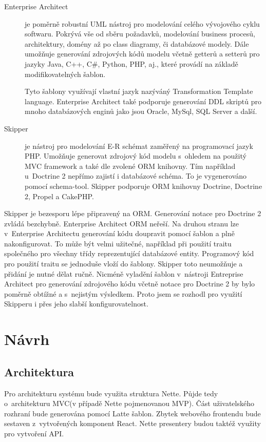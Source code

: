 \documentclass[thesis=B,czech]{FITthesis}[2012/06/26]
\begin{document}
\begin{description}
	\item[Enterprise Architect]
	je poměrně robustní UML nástroj pro modelování celého vývojového cyklu softwaru. Pokrývá vše od sběru požadavků, modelování business procesů, architektury, domény až po class diagramy, či databázové modely. Dále umožňuje generování zdrojových kódů modelu včetně getterů a setterů pro jazyky Java, C++, C\#, Python, PHP, aj., které provádí na základě modifikovatelných šablon.
	
	Tyto šablony využívají vlastní jazyk nazýváný Transformation Template language. Enterprise Architect také podporuje generování DDL skriptů pro mnoho databázových enginů jako jsou Oracle, MySql, SQL Server a další.\cite{enterprise_architect}

	\item[Skipper\cite{skipper}]
	je nástroj pro modelování E-R schémat zaměřený na programovací jazyk PHP. Umožňuje generovat zdrojový kód modelu s~ohledem na použitý MVC framework a také dle zvolené ORM knihovny. Tím například u~Doctrine 2 nepřímo zajistí i databázové schéma. To je vygenerováno pomocí schema-tool. Skipper podporuje ORM knihovny Doctrine, Doctrine 2, Propel a CakePHP.\cite{skipper_features}
\end{description}

	Skipper je bezesporu lépe připravený na ORM. Generování notace pro Doctrine 2 zvládá bezchybně. Enterprise Architect ORM neřeší. Na druhou stranu lze v~Enterprise Architectu generování kódu doupravit pomocí šablon a plně nakonfigurovat. To může být velmi užitečné, například při použití traitu společného pro všechny třídy reprezentující databázové entity. Programový kód pro použití traitu se jednoduše vloží do šablony. Skipper toto neumožňuje a přidání je nutné dělat ručně. Nicméně vyladění šablon v~nástroji Entreprise Architect pro generování zdrojového kódu včetně notace pro Doctrine 2 by bylo poměrně obtížné a s~nejistým výsledkem. Proto jsem se rozhodl pro využití Skipperu i přes jeho slabší konfigurovatelnost.	


\chapter{Návrh}

\section{Architektura}
Pro architekturu systému bude využita struktura Nette. Půjde tedy o~architekturu MVC(v případě Nette pojmenovanou MVP). Část uživatelského rozhraní bude generována pomocí Latte šablon. Zbytek webového frontendu bude sestaven z~vytvořených komponent React. Nette presentery budou taktéž využity pro vytvoření API.
\end{document}
